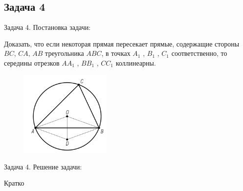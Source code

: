 \documentclass{beamer}
\begin{document}
\begin{frame}
   \subsection{Задача 4}
   \begin{block}{Задача 4. Постановка задачи:}


      Доказать, что если некоторая прямая пересекает прямые, содержащие стороны \(BC\), \(CA\), \(AB\) треугольника \(ABC\), в точках \(A_1\) , \(B_1\) , \(C_1\) соответственно, то середины отрезков \(AA_1\) , \(BB_1\) , \(CC_1\) коллинеарны.

      \begin{figure}[h]
         \centering
         \includegraphics[width=0.4\textwidth]{images/task1.png}
         \label{task4}
      \end{figure}
   \end{block}
\end{frame}

\begin{frame}
   \begin{block}{Задача 4. Решение задачи:}

      Кратко
   \end{block}
\end{frame}
\end{document}
